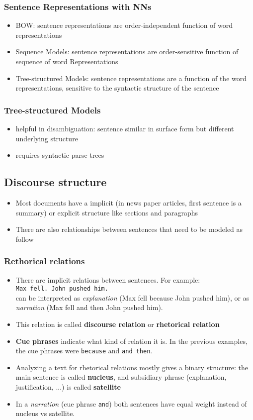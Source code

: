 \subsubsection{Sentence Representations with NNs}
\begin{itemize}
	\item BOW: sentence representations are order-independent function of word representations
	\item Sequence Models: sentence representations are order-sensitive function of sequence of word Representations
	\item Tree-structured Models: sentence representations are a function of the word representations, sensitive to the syntactic structure of the sentence
\end{itemize}
\subsubsection{Tree-structured Models}
\begin{itemize}
	\item helpful in disambiguation: sentence similar in surface form but different underlying structure
	\item requires syntactic parse trees
\end{itemize}
\subsection{Discourse structure}
\begin{itemize}
	\item Most documents have a implicit (in news paper articles, first sentence is a summary) or explicit structure like sections and paragraphs
	\item There are also relationships between sentences that need to be modeled as follow
\end{itemize}
\subsubsection{Rethorical relations}
\begin{itemize}
	\item There are implicit relations between sentences. For example:\\
	\texttt{Max fell. John pushed him.}\\
	can be interpreted as \textit{explanation} (Max fell because John pushed him), or as \textit{narration} (Max fell and then John pushed him).
	\item This relation is called \textbf{discourse relation} or \textbf{rhetorical relation}
	\item \textbf{Cue phrases} indicate what kind of relation it is. In the previous examples, the cue phrases were \texttt{because} and \texttt{and then}.
	\item Analyzing a text for rhetorical relations mostly gives a binary structure: the main sentence is called \textbf{nucleus}, and subsidiary phrase (explanation, justification, ...) is called \textbf{satellite}
	\item In a \textit{narration} (cue phrase \texttt{and}) both sentences have equal weight instead of nucleus vs satellite.
\end{itemize}
